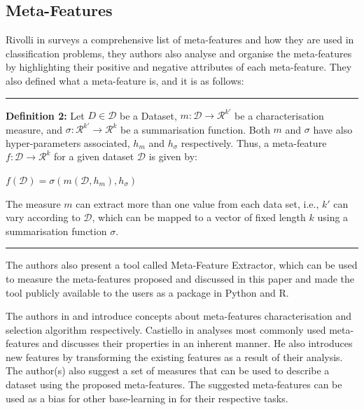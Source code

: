 \subsection*{Meta-Features}

Rivolli in \citep{meta-features-3} surveys a comprehensive list of meta-features and how they are used in classification problems, they authors also analyse and organise the meta-features by highlighting their positive and negative attributes of each meta-feature. They also defined what a meta-feature is, and it is as follows:

\par\noindent\rule{\textwidth}{0.4pt}\newline
\textbf{Definition 2:} Let ${\displaystyle{D \in \mathcal{D} }}$ be a Dataset, ${\displaystyle{m: \mathcal{D} \to \mathcal{R}^{k'}}}$ be a characterisation measure, and $\displaystyle{\sigma: \mathcal{R}^{k'} \to \mathcal{R}^{k}}$ be a summarisation function. Both $\displaystyle{m}$ and $\sigma$ have also hyper-parameters associated, $h_m$ and $h_\sigma$ respectively. Thus, a meta-feature $\displaystyle{f: \mathcal{D} \to \mathcal{R}^{k}}$ for a given dataset $\displaystyle{\mathcal{D}}$ is given by:

\begin{center}
    $\displaystyle{f(\mathcal{D}) = \sigma(m(\mathcal{D}, h_m), h_\sigma)}$
\end{center}
\newpage
The measure $\displaystyle{m}$ can extract more than one value from each data set, i.e., $\displaystyle{k'}$ can vary according to $\displaystyle{\mathcal{D}}$, which can be mapped to a vector of fixed length $\displaystyle{k}$ using a summarisation function $\displaystyle{\sigma}$.

\par\noindent\rule{\textwidth}{0.4pt}

The authors also present a tool called Meta-Feature Extractor, which can be used to measure the meta-features proposed and discussed in this paper and made the tool publicly available to the users as a package in Python and R.

The authors in \citep{meta-features-1} and \citep{meta-features-2} introduce concepts about meta-features characterisation and selection algorithm respectively. Castiello in \citep{meta-features-1} analyses most commonly used meta-features and discusses their properties in an inherent manner. He also introduces new features by transforming the existing features as a result of their analysis. The author(s) also suggest a set of measures that can be used to describe a dataset using the proposed meta-features. The suggested meta-features can be used as a bias for other base-learning in for their respective tasks. 

